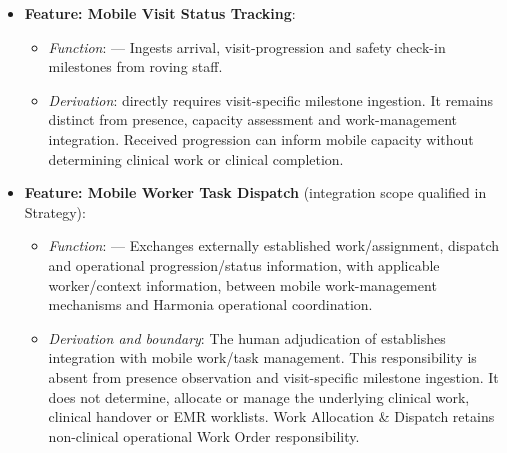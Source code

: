 \begin{itemize}
\begin{itemize}
\begin{itemize}
\item 
\emph{Exposed Service}: \texttt{} — Discloses on-duty staff availability by hospital zone.



\end{itemize}


\item 
\textbf{Feature: Mobile Visit Status Tracking}:


\begin{itemize}

\item 
\emph{Function}: \texttt{} — Ingests arrival, visit-progression and safety check-in milestones from roving staff.



\item 
\emph{Derivation}: \texttt{} directly requires visit-specific milestone ingestion. It remains distinct from presence, capacity assessment and work-management integration. Received progression can inform mobile capacity without determining clinical work or clinical completion.



\end{itemize}


\item 
\textbf{Feature: Mobile Worker Task Dispatch} (integration scope qualified in Strategy):


\begin{itemize}

\item 
\emph{Function}: \texttt{} — Exchanges externally established work/\allowbreak{}assignment, dispatch and operational progression/\allowbreak{}status information, with applicable worker/\allowbreak{}context information, between mobile work-management mechanisms and Harmonia operational coordination.



\item 
\emph{Derivation and boundary}: The human adjudication of \texttt{} establishes integration with mobile work/\allowbreak{}task management. This responsibility is absent from presence observation and visit-specific milestone ingestion. It does not determine, allocate or manage the underlying clinical work, clinical handover or EMR worklists. Work Allocation \& Dispatch retains non-clinical operational Work Order responsibility.




\end{itemize}
\end{itemize}
\end{itemize}
